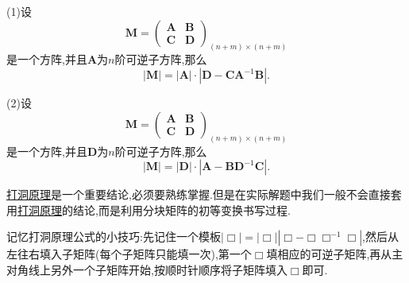 \documentclass[lang=cn,newtx,10pt,scheme=chinese]{elegantbook}
\begin{document}
\begin{proposition}[打洞原理]\label{proposition:打洞原理}
(1)设
\[
\boldsymbol{M} = 
\begin{pmatrix}
\boldsymbol{A} & \boldsymbol{B} \\
\boldsymbol{C} & \boldsymbol{D}
\end{pmatrix}_{(n + m) \times (n + m)}
\]
是一个方阵,并且\(\boldsymbol{A}\)为\(n\)阶可逆子方阵,那么
\[
|\boldsymbol{M}| = |\boldsymbol{A}| \cdot |\boldsymbol{D} - \boldsymbol{C}\boldsymbol{A}^{-1}\boldsymbol{B}|.
\]

(2)设
\[
\boldsymbol{M} = 
\begin{pmatrix}
\boldsymbol{A} & \boldsymbol{B} \\
\boldsymbol{C} & \boldsymbol{D}
\end{pmatrix}_{(n + m) \times (n + m)}
\]
是一个方阵,并且\(\boldsymbol{D}\)为\(n\)阶可逆子方阵,那么
\[
|\boldsymbol{M}| = |\boldsymbol{D}| \cdot |\boldsymbol{A} - \boldsymbol{B}\boldsymbol{D}^{-1}\boldsymbol{C}|.
\]
\end{proposition}
\begin{note}
\hyperref[proposition:打洞原理]{打洞原理}是一个重要结论,必须要熟练掌握.但是在实际解题中我们一般不会直接套用\hyperref[proposition:打洞原理]{打洞原理}的结论,而是利用分块矩阵的初等变换书写过程.

记忆打洞原理公式的小技巧:先记住一个模板$\left| \Box \right|=\left| \Box \right|\left| \Box -\Box \Box ^{-1}\Box \right|$,然后从左往右填入子矩阵(每个子矩阵只能填一次),第一个$\Box$填相应的可逆子矩阵,再从主对角线上另外一个子矩阵开始,按顺时针顺序将子矩阵填入$\Box$即可.
\end{note}
\end{document}
